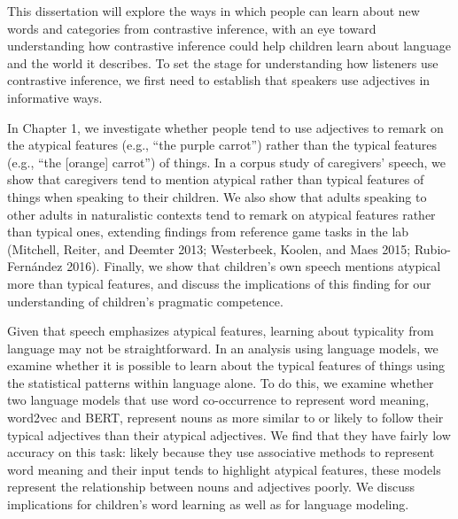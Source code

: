 \documentclass{ucetd}
\begin{document}
This dissertation will explore the ways in which people can learn about
new words and categories from contrastive inference, with an eye toward
understanding how contrastive inference could help children learn about
language and the world it describes. To set the stage for understanding
how listeners use contrastive inference, we first need to establish that
speakers use adjectives in informative ways.

In Chapter 1, we investigate whether people tend to use adjectives to
remark on the atypical features (e.g., ``the purple carrot'') rather
than the typical features (e.g., ``the {[}orange{]} carrot'') of things.
In a corpus study of caregivers' speech, we show that caregivers tend to
mention atypical rather than typical features of things when speaking to
their children. We also show that adults speaking to other adults in
naturalistic contexts tend to remark on atypical features rather than
typical ones, extending findings from reference game tasks in the lab
(Mitchell, Reiter, and Deemter 2013; Westerbeek, Koolen, and Maes 2015;
Rubio-Fernández 2016). Finally, we show that children's own speech
mentions atypical more than typical features, and discuss the
implications of this finding for our understanding of children's
pragmatic competence.

Given that speech emphasizes atypical features, learning about
typicality from language may not be straightforward. In an analysis
using language models, we examine whether it is possible to learn about
the typical features of things using the statistical patterns within
language alone. To do this, we examine whether two language models that
use word co-occurrence to represent word meaning, word2vec and BERT,
represent nouns as more similar to or likely to follow their typical
adjectives than their atypical adjectives. We find that they have fairly
low accuracy on this task: likely because they use associative methods
to represent word meaning and their input tends to highlight atypical
features, these models represent the relationship between nouns and
adjectives poorly. We discuss implications for children's word learning
as well as for language modeling.
\end{document}
